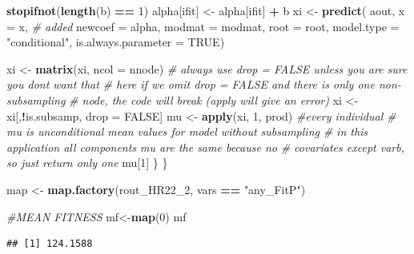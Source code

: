 \documentclass[
]{article}
\newenvironment{Shaded}{\begin{snugshade}}{\end{snugshade}}
\newcommand{\AttributeTok}[1]{\textcolor[rgb]{0.13,0.29,0.53}{#1}}
\newcommand{\CommentTok}[1]{\textcolor[rgb]{0.56,0.35,0.01}{\textit{#1}}}
\newcommand{\ConstantTok}[1]{\textcolor[rgb]{0.56,0.35,0.01}{#1}}
\newcommand{\DecValTok}[1]{\textcolor[rgb]{0.00,0.00,0.81}{#1}}
\newcommand{\FunctionTok}[1]{\textcolor[rgb]{0.13,0.29,0.53}{\textbf{#1}}}
\newcommand{\NormalTok}[1]{#1}
\newcommand{\OtherTok}[1]{\textcolor[rgb]{0.56,0.35,0.01}{#1}}
\newcommand{\SpecialCharTok}[1]{\textcolor[rgb]{0.81,0.36,0.00}{\textbf{#1}}}
\newcommand{\StringTok}[1]{\textcolor[rgb]{0.31,0.60,0.02}{#1}}
\begin{document}
\begin{Shaded}
\begin{Highlighting}[]
    \FunctionTok{stopifnot}\NormalTok{(}\FunctionTok{length}\NormalTok{(b) }\SpecialCharTok{==} \DecValTok{1}\NormalTok{)}
\NormalTok{    alpha[ifit] }\OtherTok{\textless{}{-}}\NormalTok{ alpha[ifit] }\SpecialCharTok{+}\NormalTok{ b}
\NormalTok{    xi }\OtherTok{\textless{}{-}} \FunctionTok{predict}\NormalTok{(}
\NormalTok{      aout,}
      \AttributeTok{x =}\NormalTok{ x, }\CommentTok{\# added}
      \AttributeTok{newcoef =}\NormalTok{ alpha,}
      \AttributeTok{modmat =}\NormalTok{ modmat,}
      \AttributeTok{root =}\NormalTok{ root,}
      \AttributeTok{model.type =} \StringTok{"conditional"}\NormalTok{,}
      \AttributeTok{is.always.parameter =} \ConstantTok{TRUE}\NormalTok{)}
  
\NormalTok{    xi }\OtherTok{\textless{}{-}} \FunctionTok{matrix}\NormalTok{(xi, }\AttributeTok{ncol =}\NormalTok{ nnode)}
    \CommentTok{\# always use drop = FALSE unless you are sure you don\textquotesingle{}t want that}
    \CommentTok{\# here if we omit drop = FALSE and there is only one non{-}subsampling}
    \CommentTok{\# node, the code will break (apply will give an error)}
\NormalTok{    xi }\OtherTok{\textless{}{-}}\NormalTok{ xi[,}\SpecialCharTok{!}\NormalTok{is.subsamp, drop }\OtherTok{=} \ConstantTok{FALSE}\NormalTok{]}
\NormalTok{    mu }\OtherTok{\textless{}{-}} \FunctionTok{apply}\NormalTok{(xi, }\DecValTok{1}\NormalTok{, prod) }\CommentTok{\#every individual}
    \CommentTok{\# mu is unconditional mean values for model without subsampling}
    \CommentTok{\# in this application all components mu are the same because no}
    \CommentTok{\# covariates except varb, so just return only one}
\NormalTok{    mu[}\DecValTok{1}\NormalTok{] }
\NormalTok{  \}}
\NormalTok{\}}

\NormalTok{map }\OtherTok{\textless{}{-}} \FunctionTok{map.factory}\NormalTok{(rout\_HR22\_2, vars }\SpecialCharTok{==} \StringTok{"any\_FitP"}\NormalTok{)}

\CommentTok{\#MEAN FITNESS}
\NormalTok{mf}\OtherTok{\textless{}{-}}\FunctionTok{map}\NormalTok{(}\DecValTok{0}\NormalTok{)}
\NormalTok{mf}
\end{Highlighting}
\end{Shaded}

\begin{verbatim}
## [1] 124.1588
\end{verbatim}

\begin{Shaded}
\end{Shaded}
\end{document}

